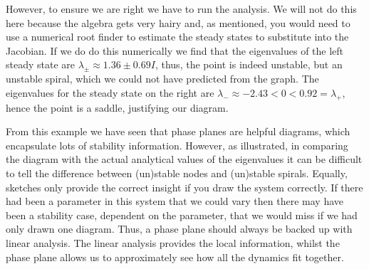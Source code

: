 \begin{example}[frametitle=Two-dimensional phase plane]
{However, to ensure we are right we have to run the analysis. We will not do this here because the algebra gets very hairy and, as mentioned, you would need to use a numerical root finder to estimate the steady states to substitute into the Jacobian. If we do do this numerically we find that the eigenvalues of the left steady state are $\lambda_\pm\approx 1.36\pm0.69I$, thus, the point is indeed unstable, but an unstable spiral, which we could not have predicted from the graph. The eigenvalues for the steady state on the right are $\lambda_-\approx -2.43<0<0.92=\lambda_+$, hence the point is a saddle, justifying our diagram.}
\end{example}



From this example we have seen that phase planes are helpful diagrams, which encapsulate lots of stability information. However, as illustrated, in comparing the diagram with the actual analytical values of the eigenvalues it can be difficult to tell the difference between (un)stable nodes and (un)stable spirals. Equally, sketches only provide the correct insight if you draw the system correctly. If there had been a parameter in this system that we could vary then there may have been a stability case, dependent on the parameter, that we would miss if we had only drawn one diagram. Thus, a phase plane should always be backed up with linear analysis. The linear analysis provides the local information, whilst the phase plane allows us to approximately see how all the dynamics fit together.

